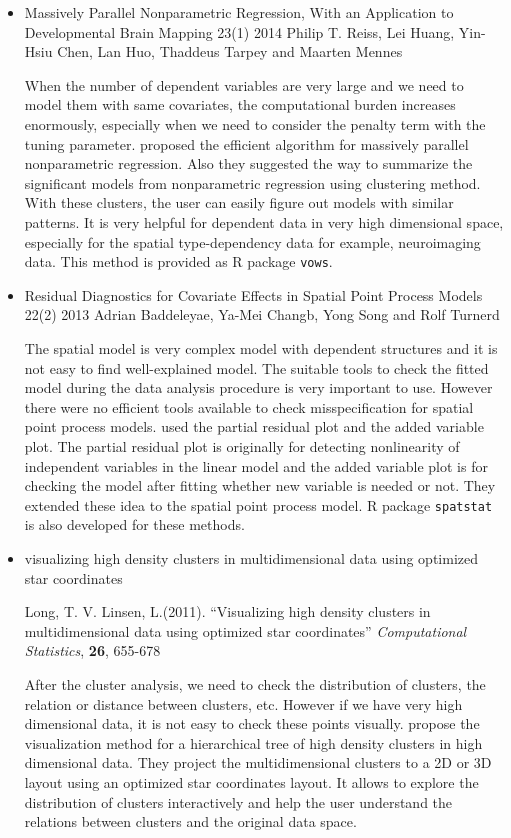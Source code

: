 \documentclass{article}
\begin{document}
\begin{itemize}
\item Massively Parallel Nonparametric Regression, With an Application to Developmental Brain Mapping 23(1) 2014
Philip T. Reiss, Lei Huang, Yin-Hsiu Chen, Lan Huo, Thaddeus Tarpey and Maarten Mennes

When the number of dependent variables are very large and we need to model them with same covariates,
 the computational burden increases enormously, especially when we need to consider the penalty term with the tuning parameter. \citet{reiss2014massively} proposed  the efficient algorithm for massively parallel nonparametric regression.
 Also they suggested the way to summarize the significant models from nonparametric regression using clustering method. With these clusters, the user can easily figure out models with similar patterns. It is very helpful for dependent data in very high dimensional space, especially for the spatial type-dependency data for example, neuroimaging data. This method is provided as R package {\tt vows}.



\item Residual Diagnostics for Covariate Effects in Spatial Point Process Models 22(2) 2013 Adrian Baddeleyae, Ya-Mei Changb, Yong Song and Rolf Turnerd

    The spatial model is very complex model with dependent structures and it is not easy to find well-explained model. The suitable tools to check the fitted model during the data analysis procedure is very important to use. However there were no efficient tools available to check misspecification for spatial point process models.  \citet{baddeley2013residual} used the partial residual plot and the added variable plot. The partial residual plot is originally for detecting nonlinearity of independent variables in the linear model and the added variable plot is for checking the model after fitting whether new variable is needed or not. They extended these idea to the spatial point process model.  R package {\tt spatstat} is also developed for these methods.


\item visualizing high density clusters in multidimensional data using optimized star coordinates

Long, T. V. Linsen, L.(2011).
``Visualizing high density clusters in multidimensional
data using optimized star coordinates''
{\em Computational Statistics}, {\bf 26}, 655-678

After the cluster analysis, we need to check the distribution of clusters, the relation or distance between clusters, etc. However if we have very high dimensional data, it is not easy to check these points visually. \citet{van2011visualizing} propose the visualization method for a hierarchical tree of high density clusters in high dimensional data. They project the multidimensional clusters to a 2D or 3D layout using an optimized star coordinates layout. It allows to explore the distribution of clusters interactively and help the user understand the relations between clusters and the original data space.


\end{itemize}
\end{document}
